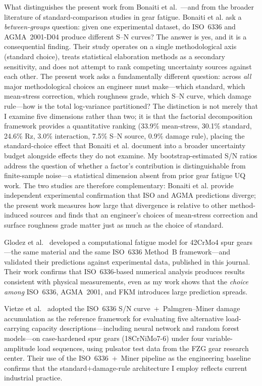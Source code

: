 \documentclass[12pt,a4paper]{article}
\begin{document}
What distinguishes the present work from
Bonaiti et al.~\cite{bonaiti2024}---and from the broader literature of
standard-comparison studies in gear fatigue. Bonaiti et al. ask a
\emph{between-groups} question: given one experimental dataset, do
ISO~6336 and AGMA~2001-D04 produce different S--N curves? The answer is
yes, and it is a consequential finding. Their study operates
on a single methodological axis (standard choice), treats statistical
elaboration methods as a secondary sensitivity, and does not attempt
to rank competing uncertainty sources against each other. The present
work asks a fundamentally different question: across \emph{all} major
methodological choices an engineer must make---which standard, which
mean-stress correction, which roughness grade, which S--N curve, which
damage rule---how is the total log-variance partitioned? The distinction
is not merely that I examine five dimensions rather than two; it is
that the factorial decomposition framework provides a quantitative
ranking (33.9\% mean-stress, 30.1\% standard, 24.6\% Rz, 3.0\%
interaction, 7.5\% S--N source, 0.9\% damage rule), placing the
standard-choice effect that Bonaiti et al. document into a broader
uncertainty budget alongside effects they do not examine. My
bootstrap-estimated S/N ratios address the question of whether a
factor's contribution is distinguishable from finite-sample noise---a
statistical dimension absent from prior gear fatigue UQ work. The two
studies are therefore complementary: Bonaiti et al. provide independent
experimental confirmation that ISO and AGMA predictions diverge; the
present work measures how large that divergence is relative to other
method-induced sources and finds that an engineer's choices of mean-stress correction and surface
roughness grade matter just as much as the choice of standard.

Glodez et al.~\cite{glodez2002} developed a computational fatigue
model for 42CrMo4 spur gears---the same material and the same
ISO~6336 Method~B framework---and validated their predictions against
experimental data, published in this journal. Their work confirms that
ISO~6336-based numerical analysis produces results consistent with
physical measurements, even as my work shows that the \emph{choice
among} ISO~6336, AGMA~2001, and FKM introduces large prediction spreads.

Vietze et al.~\cite{vietze2024} adopted the ISO~6336 S/N curve~+~Palmgren--Miner
damage accumulation as the reference framework for evaluating five alternative
load-carrying capacity descriptions---including neural network and random forest
models---on case-hardened spur gears (18CrNiMo7-6) under four variable-amplitude
load sequences, using pulsator test data from the FZG gear research center.
Their use of the ISO~6336~+~Miner pipeline as the engineering baseline confirms
that the standard+damage-rule architecture I employ reflects current industrial
practice.
\end{document}
